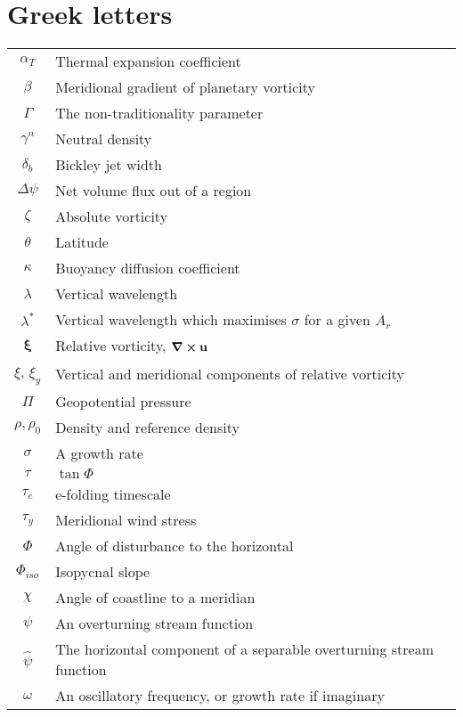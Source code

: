 \section*{Greek letters}
\begin{longtable}{cp{\textwidth}}
    $\alpha_T$ & Thermal expansion coefficient \\
    $\beta$ & Meridional gradient of planetary vorticity \\
    $\Gamma$ & The non-traditionality parameter \\
    $\gamma^n$ & Neutral density \\
    $\delta_b$ & Bickley jet width \\
    $\Delta \psi$ & Net volume flux out of a region \\
    $\zeta$ & Absolute vorticity \\
    $\theta$ & Latitude \\
    $\kappa$ & Buoyancy diffusion coefficient \\
    $\lambda$ & Vertical wavelength \\
    $\lambda^*$ & Vertical wavelength which maximises $\sigma$ for a given $A_r$ \\
    $\mathbf{\xi}$ & Relative vorticity, $\curl{\mathbf{u}}$ \\
    $\xi$, $\xi_y$ & Vertical and meridional components of relative vorticity \\
    $\Pi$ & Geopotential pressure \\
    $\rho, \rho_0$ & Density and reference density \\
    $\sigma$ & A growth rate \\
    $\tau$ & $\tan\Phi$ \\
    $\tau_e$ & e-folding timescale \\
    $\tau_y$ & Meridional wind stress \\
    $\Phi$ & Angle of disturbance to the horizontal \\
    $\Phi_{iso}$ & Isopycnal slope \\
    $\chi$ & Angle of coastline to a meridian \\
    $\psi$ & An overturning stream function \\
    $\hat{\psi}$ & The horizontal component of a separable overturning stream function \\
    $\omega$ & An oscillatory frequency, or growth rate if imaginary \\
\end{longtable}

